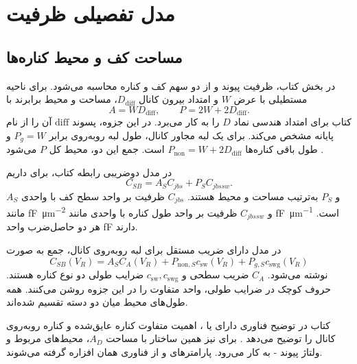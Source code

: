 \section{مدل تفصیلی ظرفیت }
\subsection{مساحت کف و محیط کناره‌ها}
در بخش  کتاب، ظرفیت پیوند  و  از دو سهم
کف و کناره محاسبه می‌شود. برای ناحیه مستطیلی با عرض \(W\) و امتداد بیرون
کانال \(D_{\mathrm{diff}}\)، مساحت و محیط برابرند با
\begin{equation}
 A=WD_{\mathrm{diff}},\qquad P=2W+2D_{\mathrm{diff}}.
 \label{eq:cv-diffusion-geometry}
\end{equation}
کتاب برای امتداد هندسی نماد \(D\) را به کار می‌برد. در این جزوه، پسوند
\(\mathrm{diff}\) آن را از نام پایانه  مشخص می‌کند.
برای یک لبه مجاور کانال، طول لبه روبه‌روی  برابر \(P_g=W\) و طول
باقی کناره‌ها \(P_{\mathrm{non}}=W+2D_{\mathrm{diff}}\) است.
جمع این دو، محیط کل \(P\) می‌شود \cite[شکل ]{weste}.

در مدل دوضریبی رابطه  کتاب، برای  داریم
\begin{equation}
 C_{SB}=A_SC_{jbs}+P_SC_{jbssw}.
 \label{eq:cv-two-coeff-junction}
\end{equation}
\(A_S\) و \(P_S\) به‌ترتیب مساحت و محیط  هستند.
\(C_{jbs}\) ظرفیت بر واحد سطح کف با واحدی مانند
\unit{\femto\farad\per\micro\metre\squared} و \(C_{jbssw}\) ظرفیت بر واحد طول
کناره با واحدی مانند \unit{\femto\farad\per\micro\metre} است.
هر دو حاصل‌ضرب واحد \unit{\femto\farad} دارند.

در مدل دارای ضریب مستقل برای لبه روبه‌روی کانال، جمع به صورت
\begin{equation}
 C_{SB}(V_R)=A_SC_A(V_R)+P_{\mathrm{non},S}c_{\mathrm{sw}}(V_R)
 +P_{g,S}c_{\mathrm{swg}}(V_R)
 \label{eq:cv-three-coeff-junction}
\end{equation}
نوشته می‌شود. \(C_A\) ضریب سطحی و \(c_{\mathrm{sw}},c_{\mathrm{swg}}\)
ضرایب طولی دو نوع کناره هستند. حروف کوچک در ضرایب طولی، واحد متفاوت را
در این جزوه روشن می‌کنند. همه طول‌های محیط میان دو دسته تقسیم شده‌اند.

کتاب در توضیح فناوری دارای  یا ،
اهمیت متفاوت کناره عایق‌شده و کناره روبه‌روی کانال را توضیح می‌دهد
\cite[صفحه ۷۲]{weste}. برای  نیز همین ساختار با مساحت \(A_D\)،
محیط‌های مربوط و ولتاژ پیوند - به کار می‌رود.
پارامترهای  و  از فناوری همان افزاره گرفته می‌شوند.

